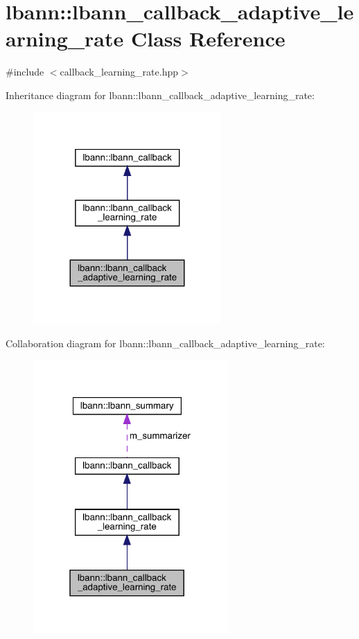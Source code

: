 \hypertarget{classlbann_1_1lbann__callback__adaptive__learning__rate}{}\section{lbann\+:\+:lbann\+\_\+callback\+\_\+adaptive\+\_\+learning\+\_\+rate Class Reference}
\label{classlbann_1_1lbann__callback__adaptive__learning__rate}


{\ttfamily \#include $<$callback\+\_\+learning\+\_\+rate.\+hpp$>$}



Inheritance diagram for lbann\+:\+:lbann\+\_\+callback\+\_\+adaptive\+\_\+learning\+\_\+rate\+:\nopagebreak
\begin{figure}[H]
\begin{center}
\leavevmode
\includegraphics[width=203pt]{classlbann_1_1lbann__callback__adaptive__learning__rate__inherit__graph}
\end{center}
\end{figure}


Collaboration diagram for lbann\+:\+:lbann\+\_\+callback\+\_\+adaptive\+\_\+learning\+\_\+rate\+:\nopagebreak
\begin{figure}[H]
\begin{center}
\leavevmode
\includegraphics[width=211pt]{classlbann_1_1lbann__callback__adaptive__learning__rate__coll__graph}
\end{center}
\end{figure}
